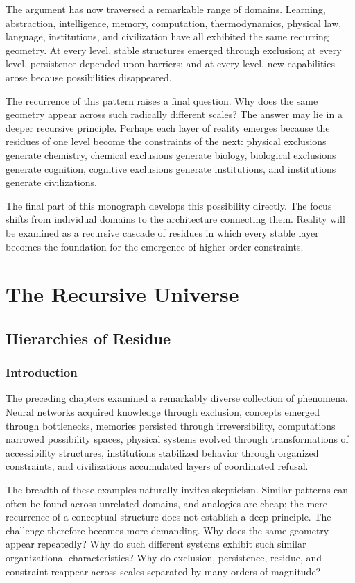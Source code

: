 \documentclass[11pt,oneside]{book}
\theoremstyle{plain}
\theoremstyle{definition}
\theoremstyle{remark}
\begin{document}
The argument has now traversed a remarkable range of domains. Learning, abstraction, intelligence, memory, computation, thermodynamics, physical law, language, institutions, and civilization have all exhibited the same recurring geometry. At every level, stable structures emerged through exclusion; at every level, persistence depended upon barriers; and at every level, new capabilities arose because possibilities disappeared.

The recurrence of this pattern raises a final question. Why does the same geometry appear across such radically different scales? The answer may lie in a deeper recursive principle. Perhaps each layer of reality emerges because the residues of one level become the constraints of the next: physical exclusions generate chemistry, chemical exclusions generate biology, biological exclusions generate cognition, cognitive exclusions generate institutions, and institutions generate civilizations.

The final part of this monograph develops this possibility directly. The focus shifts from individual domains to the architecture connecting them. Reality will be examined as a recursive cascade of residues in which every stable layer becomes the foundation for the emergence of higher-order constraints.

\part{The Recursive Universe}

\chapter{Hierarchies of Residue}

\section{Introduction}

The preceding chapters examined a remarkably diverse collection of phenomena. Neural networks acquired knowledge through exclusion, concepts emerged through bottlenecks, memories persisted through irreversibility, computations narrowed possibility spaces, physical systems evolved through transformations of accessibility structures, institutions stabilized behavior through organized constraints, and civilizations accumulated layers of coordinated refusal.

The breadth of these examples naturally invites skepticism. Similar patterns can often be found across unrelated domains, and analogies are cheap; the mere recurrence of a conceptual structure does not establish a deep principle. The challenge therefore becomes more demanding. Why does the same geometry appear repeatedly? Why do such different systems exhibit such similar organizational characteristics? Why do exclusion, persistence, residue, and constraint reappear across scales separated by many orders of magnitude?
\end{document}
